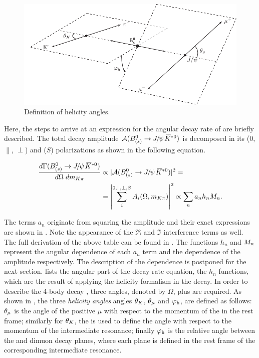 \begin{figure}[t]
  \centering
  \includegraphics[width=\textwidth]{Figures/Chapter4/helAngles}
  \caption{Definition of helicity angles.}
  \label{helAngles}
\end{figure}

Here, the steps to arrive at an expression for the angular decay rate of \BsJpsiKst are briefly described.
The total decay amplitude $\mathcal{A}(\text{\BJpsiKst})$ is decomposed in its \pwave ($0$, $\parallel$, $\perp$)
and \swave ($S$) polarizations as shown in the following equation.

\begin{align}
  \centering
  \frac{d\Gamma(\text{\BJpsiKst})}{d\Omega\;d\mkpi} &\propto |\mathcal{A}(\text{\BJpsiKst})|^2 = \nonumber \\
                                                    &= \left| \sum_i^{0,\parallel,\perp,S} A_i(\Omega,\mkpi) \right|^2  \propto \sum_n a_n h_n \mKpiAmp.
  \label{ang_terms}
\end{align}

\noindent The terms $a_n$ originate from squaring the amplitude and their exact expressions are shown in .
Note the appearance of the $\Re$ and $\Im$ interference terms as well. The full derivation of the above table can be found in \cite{jeroenThesis}.
The functions $h_n$ and $M_{n}$ represent the angular dependence of each $a_n$ term and the \mkpi
dependence of the amplitude respectively. The description of the \mkpi dependence is postponed for the next section. 
lists the angular part of the decay rate equation, \ie the $h_n$ functions, which are the result of
applying the helicity formalism in the \BJpsiKst decay. In order to describe the 4-body decay \BJpsiKst, three
angles, denoted by $\Omega$, plus \mkpi are required. As shown in , the three \emph{helicity angles} angles
$\theta_{K}$, $\theta_{\mu}$ and $\varphi_{\text h}$, are defined as follows: $\theta_{\mu}$ is the angle of the positive $\mu$ with respect to the
momentum of the \jpsi in the \Bs rest frame; similarly for $\theta_{K}$, the \kaon is used to define the angle with respect to
the momentum of the intermediate \Kpi resonance; finally $\varphi_{\text h}$ is the relative angle between the \Kpi and dimuon decay
planes, where each plane is defined in the rest frame of the corresponding intermediate resonance.

